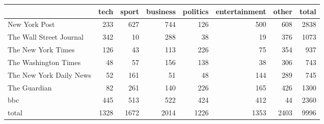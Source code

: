 \begin{tabular}{lrrrrrrr}
\toprule
{} &  tech &  sport &  business &  politics &  entertainment &  other &  total \\
\midrule
New York Post           &   233 &    627 &       744 &       126 &            500 &    608 &   2838 \\
The Wall Street Journal &   342 &     10 &       288 &        38 &             19 &    376 &   1073 \\
The New York Times      &   126 &     43 &       113 &       226 &             75 &    354 &    937 \\
The Washington Times    &    48 &     57 &       156 &       138 &             38 &    306 &    743 \\
The New York Daily News &    52 &    161 &        51 &        48 &            144 &    289 &    745 \\
The Guardian            &    82 &    261 &       140 &       226 &            165 &    426 &   1300 \\
bbc                     &   445 &    513 &       522 &       424 &            412 &     44 &   2360 \\
total                   &  1328 &   1672 &      2014 &      1226 &           1353 &   2403 &   9996 \\
\bottomrule
\end{tabular}
